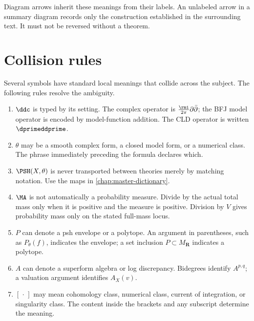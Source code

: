 Diagram arrows inherit these meanings from their labels.  An unlabeled
arrow in a summary diagram records only the construction established in
the surrounding text.  It must not be reversed without a theorem.

\section{Collision rules}
\label{sec:appK-collisions}


Several symbols have standard local meanings that collide across the
subject.  The following rules resolve the ambiguity.

\begin{enumerate}
\item \(\ddc\) is typed by its setting.  The complex operator is
  \(\frac{\rmi}{2\pi}\partial\bar\partial\); the BFJ model operator is encoded
  by model-function addition.  The CLD operator is written
  \(\dprimeddprime\).

\item \(\theta\) may be a smooth complex form, a closed model form, or a
  numerical class.  The phrase immediately preceding the formula declares
  which.

\item \(\PSH(X,\theta)\) is never transported between theories merely by
  matching notation.  Use the maps in \cref{chap:master-dictionary}.

\item \(\MA\) is not automatically a probability measure.  Divide by
  the actual total mass only when it is positive and the measure is
  positive. Division by \(V\) gives probability mass only on the stated
  full-mass locus.

\item \(P\) can denote a psh envelope or a polytope.  An argument in
  parentheses, such as \(P_\theta(f)\), indicates the envelope; a set
  inclusion \(P\subset M_{\mathbf R}\) indicates a polytope.

\item \(A\) can denote a superform algebra or log discrepancy.  Bidegrees
  identify \(A^{p,q}\); a valuation argument identifies \(A_X(v)\).

\item \([\,\cdot\,]\) may mean cohomology class, numerical class, current of
  integration, or singularity class.  The content inside the brackets and
  any subscript determine the meaning.


\end{enumerate}

